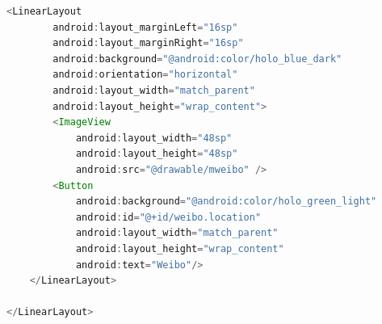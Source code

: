 \documentclass[UTF8, Microsoft YaHei]{book}
\begin{document}
\begin{small}
\begin{lstlisting}[language=java]
    <LinearLayout
        android:layout_marginLeft="16sp"
        android:layout_marginRight="16sp"
        android:background="@android:color/holo_blue_dark"
        android:orientation="horizontal"
        android:layout_width="match_parent"
        android:layout_height="wrap_content">
        <ImageView
            android:layout_width="48sp"
            android:layout_height="48sp"
            android:src="@drawable/mweibo" />
        <Button
            android:background="@android:color/holo_green_light"
            android:id="@+id/weibo.location"
            android:layout_width="match_parent"
            android:layout_height="wrap_content"
            android:text="Weibo"/>
    </LinearLayout>

</LinearLayout>
\end{lstlisting}
\end{small}
\end{document}
